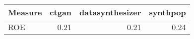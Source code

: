 \begin{tabular}{lrrr}
  \toprule
Measure & ctgan & datasynthesizer & synthpop \\ 
  \midrule
ROE & 0.21 & 0.21 & 0.24 \\ 
   \bottomrule
\end{tabular}
